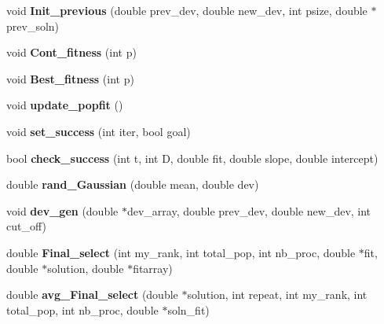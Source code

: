 \begin{DoxyCompactItemize}
\item 
\hypertarget{classOptAlg_a492a3ed39231569801db4cf8f271da9f}{}void {\bfseries Init\+\_\+previous} (double prev\+\_\+dev, double new\+\_\+dev, int psize, double $\ast$prev\+\_\+soln)\label{classOptAlg_a492a3ed39231569801db4cf8f271da9f}

\item 
\hypertarget{classOptAlg_a777e1aa4c2eff276b03b1e68e0ae575e}{}void {\bfseries Cont\+\_\+fitness} (int p)\label{classOptAlg_a777e1aa4c2eff276b03b1e68e0ae575e}

\item 
\hypertarget{classOptAlg_a1bfdb110e81c3ecb852661df45abcaa8}{}void {\bfseries Best\+\_\+fitness} (int p)\label{classOptAlg_a1bfdb110e81c3ecb852661df45abcaa8}

\item 
\hypertarget{classOptAlg_a7db6fbc363c4d98858d7c10a60c26e96}{}void {\bfseries update\+\_\+popfit} ()\label{classOptAlg_a7db6fbc363c4d98858d7c10a60c26e96}

\item 
\hypertarget{classOptAlg_aede105b27f0777435108e3c8d79b0e91}{}void {\bfseries set\+\_\+success} (int iter, bool goal)\label{classOptAlg_aede105b27f0777435108e3c8d79b0e91}

\item 
\hypertarget{classOptAlg_a41481c4ce793a16e68a4d5950a9dfe48}{}bool {\bfseries check\+\_\+success} (int t, int D, double fit, double slope, double intercept)\label{classOptAlg_a41481c4ce793a16e68a4d5950a9dfe48}

\item 
\hypertarget{classOptAlg_ac6082918315a026c3d99c9e01b5820f7}{}double {\bfseries rand\+\_\+\+Gaussian} (double mean, double dev)\label{classOptAlg_ac6082918315a026c3d99c9e01b5820f7}

\item 
\hypertarget{classOptAlg_a066626a5ae556db202925836792d86af}{}void {\bfseries dev\+\_\+gen} (double $\ast$dev\+\_\+array, double prev\+\_\+dev, double new\+\_\+dev, int cut\+\_\+off)\label{classOptAlg_a066626a5ae556db202925836792d86af}

\item 
\hypertarget{classOptAlg_a6ea07ecb3d0dd5cbc13cd8b773c460c5}{}double {\bfseries Final\+\_\+select} (int my\+\_\+rank, int total\+\_\+pop, int nb\+\_\+proc, double $\ast$fit, double $\ast$solution, double $\ast$fitarray)\label{classOptAlg_a6ea07ecb3d0dd5cbc13cd8b773c460c5}

\item 
\hypertarget{classOptAlg_a99ec1f986f0b41c6d804d27ba6312b44}{}double {\bfseries avg\+\_\+\+Final\+\_\+select} (double $\ast$solution, int repeat, int my\+\_\+rank, int total\+\_\+pop, int nb\+\_\+proc, double $\ast$soln\+\_\+fit)\label{classOptAlg_a99ec1f986f0b41c6d804d27ba6312b44}


\end{DoxyCompactItemize}
